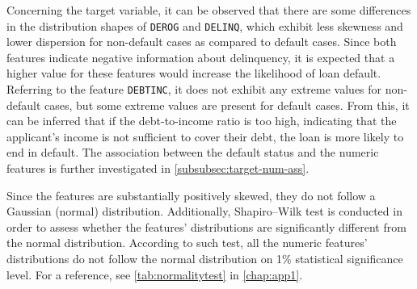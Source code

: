 \newpage
Concerning the target variable, it can be observed that there are some differences in the distribution shapes of \texttt{DEROG} and \texttt{DELINQ}, which exhibit less skewness and lower dispersion for non-default cases as compared to default cases.
Since both features indicate negative information about delinquency, it is expected that a higher value for these features would increase the likelihood of loan default.
Referring to the feature \texttt{DEBTINC}, it does not exhibit any extreme values for non-default cases, but some extreme values are present for default cases.
From this, it can be inferred that if the debt-to-income ratio is too high, indicating that the applicant's income is not sufficient to cover their debt, the loan is more likely to end in default.
The association between the default status and the numeric features is further investigated in \autoref{subsubsec:target-num-ass}.


Since the features are substantially positively skewed, they do not follow a Gaussian (normal) distribution. Additionally, Shapiro--Wilk test is conducted in order to assess whether the features' distributions are significantly different from the normal distribution.
According to such test, all the numeric features' distributions do not follow the normal distribution on 1\% statistical significance level.
For a reference, see \autoref{tab:normalitytest} in \autoref{chap:app1}.


